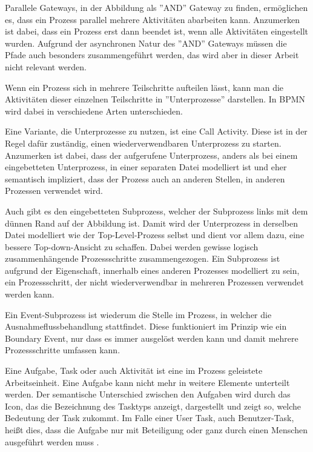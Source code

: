 Parallele Gateways, in der Abbildung als ''AND'' Gateway zu finden, ermöglichen es, dass ein Prozess parallel mehrere Aktivitäten abarbeiten kann. Anzumerken ist dabei, dass ein Prozess erst dann beendet ist, wenn alle Aktivitäten eingestellt wurden. Aufgrund der asynchronen Natur des ''AND'' Gateways müssen die Pfade auch besonders zusammengeführt werden, das wird aber in dieser Arbeit nicht relevant werden. \citep[vgl.][S. 41]{bruce_englisch_2011}

Wenn ein Prozess sich in mehrere Teilschritte aufteilen lässt, kann man die Aktivitäten dieser einzelnen Teilschritte in ''Unterprozesse'' darstellen. In BPMN wird dabei in verschiedene Arten unterschieden. \citep[vgl.][S. 41]{bruce_bpmn_2012}

Eine Variante, die Unterprozesse zu nutzen, ist eine Call Activity. Diese ist in der Regel dafür zuständig, einen wiederverwendbaren Unterprozess zu starten. Anzumerken ist dabei, dass der aufgerufene Unterprozess, anders als bei einem eingebetteten Unterprozess, in einer separaten Datei modelliert ist und eher semantisch impliziert, dass der Prozess auch an anderen Stellen, in anderen Prozessen verwendet wird. \citep[vgl.][S. 38f]{bruce_englisch_2011}

Auch gibt es den eingebetteten Subprozess, welcher der Subprozess links mit dem dünnen Rand auf der Abbildung ist. Damit wird der Unterprozess in derselben Datei modelliert wie der Top-Level-Prozess selbst und dient vor allem dazu, eine bessere Top-down-Ansicht zu schaffen. Dabei werden gewisse logisch zusammenhängende Prozessschritte zusammengezogen. Ein Subprozess ist aufgrund der Eigenschaft, innerhalb eines anderen Prozesses modelliert zu sein, ein Prozessschritt, der nicht wiederverwendbar in mehreren Prozessen verwendet werden kann. \citep[vgl.][S. 35, 37f]{bruce_englisch_2011}

Ein Event-Subprozess ist wiederum die Stelle im Prozess, in welcher die Ausnahmeflussbehandlung stattfindet. Diese funktioniert im Prinzip wie ein Boundary Event, nur dass es immer ausgelöst werden kann und damit mehrere Prozessschritte umfassen kann. \citep[vgl.][S. 111f]{bruce_englisch_2011}

Eine Aufgabe, Task oder auch Aktivität ist eine im Prozess geleistete Arbeitseinheit. Eine Aufgabe kann nicht mehr in weitere Elemente unterteilt werden. Der semantische Unterschied zwischen den Aufgaben wird durch das Icon, das die Bezeichnung des Tasktyps anzeigt, dargestellt und zeigt so, welche Bedeutung der Task zukommt. Im Falle einer User Task, auch Benutzer-Task, heißt dies, dass die Aufgabe nur mit Beteiligung oder ganz durch einen Menschen ausgeführt werden muss \citep[vgl.][S. 39ff]{bruce_bpmn_2012}.

